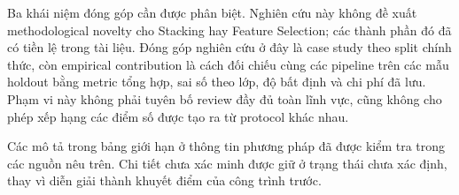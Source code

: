Ba khái niệm đóng góp cần được phân biệt. Nghiên cứu này không đề xuất methodological novelty cho Stacking hay Feature Selection; các thành phần đó đã có tiền lệ trong tài liệu. Đóng góp nghiên cứu ở đây là case study theo split chính thức, còn empirical contribution là cách đối chiếu cùng các pipeline trên các mẫu holdout bằng metric tổng hợp, sai số theo lớp, độ bất định và chi phí đã lưu. Phạm vi này không phải tuyên bố review đầy đủ toàn lĩnh vực, cũng không cho phép xếp hạng các điểm số được tạo ra từ protocol khác nhau.

Các mô tả trong bảng giới hạn ở thông tin phương pháp đã được kiểm tra trong các nguồn nêu trên. Chi tiết chưa xác minh được giữ ở trạng thái chưa xác định, thay vì diễn giải thành khuyết điểm của công trình trước.
